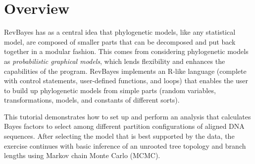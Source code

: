 \section*{Overview}

RevBayes has as a central idea that phylogenetic models, like any statistical model, are composed of smaller parts that can be decomposed and 
put back together in a modular fashion. This comes from considering phylogenetic models as \textit{probabilistic graphical models}, 
which lends flexibility and enhances the capabilities of the program. 
RevBayes implements an R-like language (complete with control statements, user-defined functions, and loops) 
that enables the user to build up phylogenetic models from simple parts (random variables, transformations, models, 
and constants of different sorts).
%

 

This tutorial demonstrates how to set up and perform an analysis that calculates Bayes factors to select among different 
partition configurations of aligned DNA sequences. 
After selecting the model that is best supported by the data, the exercise continues with basic inference of an unrooted 
tree topology and branch lengths using Markov chain Monte Carlo (MCMC). 




